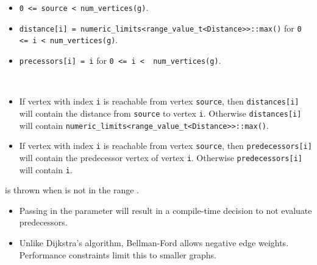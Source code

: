 \begin{itemdescr}
      \pnum\preconditions
            \begin{itemize}
                  \item
                        \lstinline{0 <= source < num_vertices(g)}. 
                  \item
                        \lstinline{distance[i] = numeric_limits<range_value_t<Distance>>::max()}
                        for \lstinline{0 <= i < num_vertices(g)}.  
                        \\ 
                  \item
                        \lstinline{precessors[i] = i} for \lstinline{0 <= i <  num_vertices(g)}.
            \end{itemize}
      \pnum\effects \\
            \begin{itemize}
                  \item
                        If vertex with index \lstinline{i} is reachable from vertex \lstinline{source}, then
                        \lstinline{distances[i]} will contain the distance from \lstinline{source} to vertex
                        \lstinline{i}.  Otherwise \lstinline{distances[i]} will contain
                        \lstinline{numeric_limits<range_value_t<Distance>>::max()}.
                  \item
                        If vertex with index \lstinline{i} is reachable
                        from vertex \lstinline{source}, then \lstinline{predecessors[i]} will contain the
                        predecessor vertex of vertex \lstinline{i}. Otherwise \lstinline{predecessors[i]} will contain
                        \lstinline{i}.
            \end{itemize}
      \pnum\throws {} is thrown when  is not in the range .  \\
      \pnum\remarks 
            \begin{itemize}
                  \item 
                        Passing  in the  parameter will result in a compile-time decision
                        to not evaluate predecessors.
                  \item
                        Unlike Dijkstra's algorithm, Bellman-Ford allows negative edge weights. Performance constraints limit this to smaller graphs.
            \end{itemize}
\end{itemdescr}



